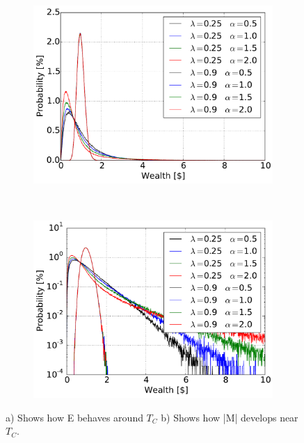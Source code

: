 \begin{figure}[H]
    \centering
    \begin{subfigure}{0.5\textwidth}
        \centering
        \includegraphics[width=\linewidth]{result/bilder/5d-2590}
        \caption{}
    \end{subfigure}%
    ~ 
    \begin{subfigure}{0.5\textwidth}
        \centering
        \includegraphics[width=\linewidth]{result/bilder/5d-2590-log}
        \caption{}
    \end{subfigure}
    \caption{a) Shows how E behaves around $T_C$ b) Shows how |M| develops near $T_C$.}
    \label{fig:5d-2590}
\end{figure}



